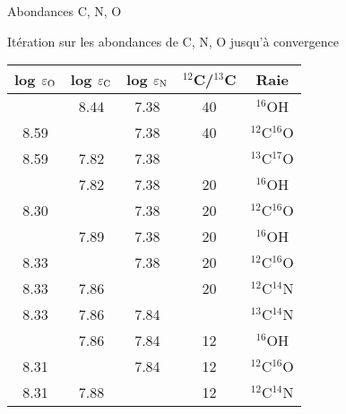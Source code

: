 \documentclass[10pt]{beamer}
\begin{document}
\begin{frame}[fragile]{Abondances C, N, O}

    Itération sur les abondances de C, N, O jusqu'à convergence
    
    \begin{table}[h!]
          \vspace{0.3cm}
        \begin{center}
            \begin{tabular}{ccccc}
                \hline
                \hline
                log $\varepsilon_{\rm O}$ & log $\varepsilon_{\rm C}$ & log $\varepsilon_{\rm N}$ & $^{12}$C/$^{13}$C & Raie\\
                \hline
                \cellcolor{blue!15}{8.59 $\pm$ 0.01} & 8.44 & 7.38 & 40 & $^{16}$OH \\
            8.59 & \cellcolor{blue!15}{7.82 $\pm$ 0.03} & 7.38 & 40 & $^{12}$C$^{16}$O \\
            8.59 & 7.82 & 7.38 & \cellcolor{blue!15}{20} & $^{13}$C$^{17}$O \\
            \cellcolor{blue!15}{8.30 $\pm$ 0.02} & 7.82 & 7.38 & 20 & $^{16}$OH \\
            8.30 & \cellcolor{blue!15}{7.89 $\pm$ 0.02} & 7.38 & 20 & $^{12}$C$^{16}$O \\
            \cellcolor{blue!15}{8.33 $\pm$ 0.02} & 7.89 & 7.38 & 20 & $^{16}$OH \\
            8.33 & \cellcolor{blue!15}{7.86 $\pm$ 0.03} & 7.38 & 20 & $^{12}$C$^{16}$O \\
            8.33 & 7.86 & \cellcolor{blue!15}{7.84 $\pm$ 0.02} & 20 & $^{12}$C$^{14}$N \\
            8.33 & 7.86 & 7.84 & \cellcolor{blue!15}{12} & $^{13}$C$^{14}$N \\
            \cellcolor{blue!15}{8.31 $\pm$ 0.01} & 7.86 & 7.84 & 12 & $^{16}$OH \\
            8.31 & \cellcolor{blue!15}{7.88 $\pm$ 0.03} & 7.84 & 12 & $^{12}$C$^{16}$O \\
            8.31 & 7.88 & \cellcolor{blue!15}{7.84 $\pm$ 0.02} & 12 & $^{12}$C$^{14}$N \\
            \end{tabular}
        \end{center} 
        \end{table} 
    
    \end{frame}
\end{document}
